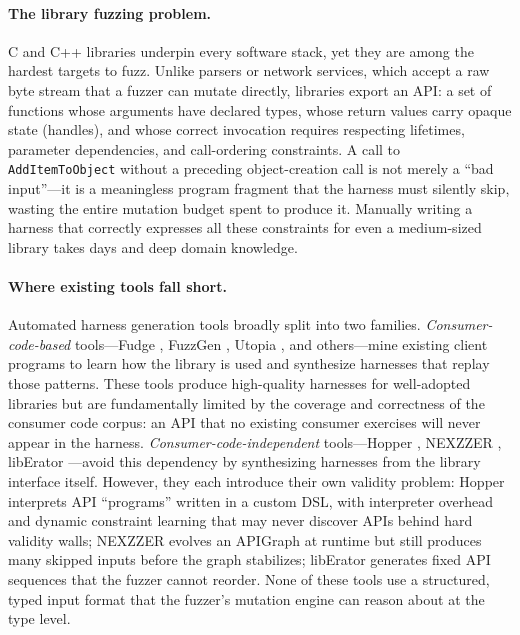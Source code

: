 \documentclass[sigconf,anonymous]{acmart}
\begin{document}
\paragraph{The library fuzzing problem.}
C and C++ libraries underpin every software stack, yet they are among
the hardest targets to fuzz.  Unlike parsers or network services, which
accept a raw byte stream that a fuzzer can mutate directly, libraries
export an API: a set of functions whose arguments have declared types,
whose return values carry opaque state (handles), and whose correct
invocation requires respecting lifetimes, parameter dependencies, and
call-ordering constraints.  A call to \texttt{AddItemToObject}
without a preceding object-creation call is not merely a
``bad input''---it is a meaningless program fragment that the harness
must silently skip, wasting the entire mutation budget spent to produce
it.  Manually writing a harness that correctly expresses all these
constraints for even a medium-sized library takes days and deep
domain knowledge.

\paragraph{Where existing tools fall short.}
Automated harness generation tools broadly split into two families.
\emph{Consumer-code-based} tools---Fudge \cite{fudge19}, FuzzGen
\cite{fuzzgen19}, Utopia \cite{utopia22}, and others---mine existing
client programs to learn how the library is used and synthesize
harnesses that replay those patterns.  These tools produce high-quality
harnesses for well-adopted libraries but are fundamentally limited by
the coverage and correctness of the consumer code corpus: an API that
no existing consumer exercises will never appear in the harness.
\emph{Consumer-code-independent} tools---Hopper \cite{hopper_ccs23},
NEXZZER \cite{nexzzer_ndss25}, libErator \cite{liberator_fse25}---avoid
this dependency by synthesizing harnesses from the library interface
itself.  However, they each introduce their own validity problem: Hopper
interprets API ``programs'' written in a custom DSL, with interpreter
overhead and dynamic constraint learning that may never discover APIs
behind hard validity walls; NEXZZER evolves an APIGraph at runtime but
still produces many skipped inputs before the graph stabilizes; libErator
generates fixed API sequences that the fuzzer cannot reorder.  None of
these tools use a structured, typed input format that the fuzzer's
mutation engine can reason about at the type level.
\end{document}
